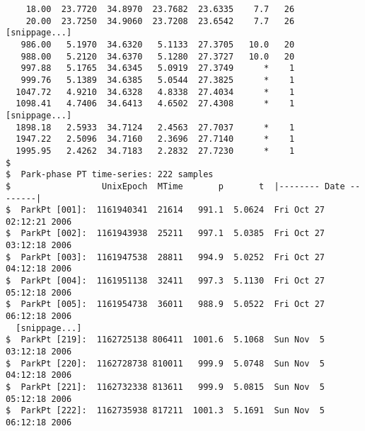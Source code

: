 {\begin{verbatim}
    18.00  23.7720  34.8970  23.7682  23.6335    7.7   26
    20.00  23.7250  34.9060  23.7208  23.6542    7.7   26
[snippage...]
   986.00   5.1970  34.6320   5.1133  27.3705   10.0   20
   988.00   5.2120  34.6370   5.1280  27.3727   10.0   20
   997.88   5.1765  34.6345   5.0919  27.3749      *    1
   999.76   5.1389  34.6385   5.0544  27.3825      *    1
  1047.72   4.9210  34.6328   4.8338  27.4034      *    1
  1098.41   4.7406  34.6413   4.6502  27.4308      *    1
[snippage...]
  1898.18   2.5933  34.7124   2.4563  27.7037      *    1
  1947.22   2.5096  34.7160   2.3696  27.7140      *    1
  1995.95   2.4262  34.7183   2.2832  27.7230      *    1
$
$  Park-phase PT time-series: 222 samples
$                  UnixEpoch  MTime       p       t  |-------- Date --------|
$  ParkPt [001]:  1161940341  21614   991.1  5.0624  Fri Oct 27 02:12:21 2006
$  ParkPt [002]:  1161943938  25211   997.1  5.0385  Fri Oct 27 03:12:18 2006
$  ParkPt [003]:  1161947538  28811   994.9  5.0252  Fri Oct 27 04:12:18 2006
$  ParkPt [004]:  1161951138  32411   997.3  5.1130  Fri Oct 27 05:12:18 2006
$  ParkPt [005]:  1161954738  36011   988.9  5.0522  Fri Oct 27 06:12:18 2006
  [snippage...]
$  ParkPt [219]:  1162725138 806411  1001.6  5.1068  Sun Nov  5 03:12:18 2006
$  ParkPt [220]:  1162728738 810011   999.9  5.0748  Sun Nov  5 04:12:18 2006
$  ParkPt [221]:  1162732338 813611   999.9  5.0815  Sun Nov  5 05:12:18 2006
$  ParkPt [222]:  1162735938 817211  1001.3  5.1691  Sun Nov  5 06:12:18 2006
\end{verbatim}}


